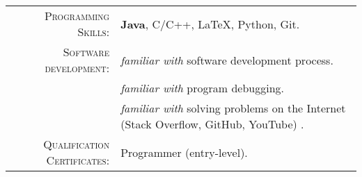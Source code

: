 %
%


 
\renewcommand{\arraystretch}{1.1}

	\begin{tabular}{>{}r>{}p{13cm}} 
		\textsc{Programming Skills:}    &  \textbf{Java}, C/C++, \LaTeX, Python, Git.\\  
		\textsc{Software development:} 		&  \emph{familiar with} software development process.\\
										&  \emph{familiar with} program debugging.\\
										&  \emph{familiar with} solving problems on the Internet (Stack Overflow, GitHub, YouTube) .\\
		\textsc{Qualification Certificates:}		&  Programmer (entry-level).
	\end{tabular}